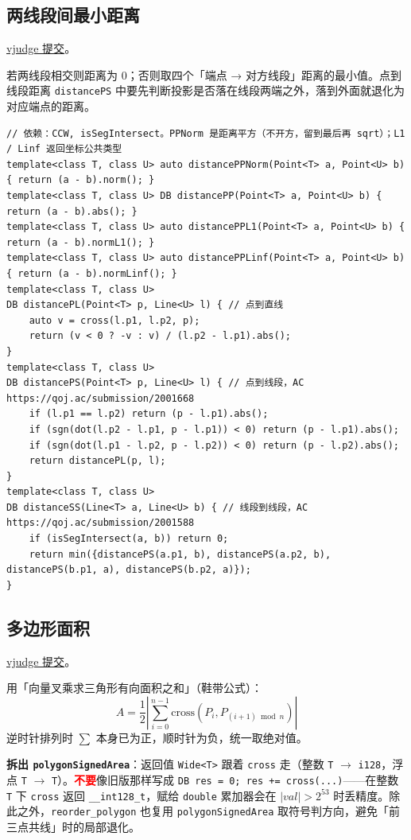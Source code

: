 		\subsection{两线段间最小距离}

		\href{https://vjudge.net/solution/64187931}{vjudge 提交}。

		若两线段相交则距离为 $0$；否则取四个「端点 → 对方线段」距离的最小值。点到线段距离 \texttt{distancePS} 中要先判断投影是否落在线段两端之外，落到外面就退化为对应端点的距离。

\begin{verbatim}
// 依赖：CCW, isSegIntersect。PPNorm 是距离平方（不开方，留到最后再 sqrt）；L1 / Linf 返回坐标公共类型
template<class T, class U> auto distancePPNorm(Point<T> a, Point<U> b) { return (a - b).norm(); }
template<class T, class U> DB distancePP(Point<T> a, Point<U> b) { return (a - b).abs(); }
template<class T, class U> auto distancePPL1(Point<T> a, Point<U> b) { return (a - b).normL1(); }
template<class T, class U> auto distancePPLinf(Point<T> a, Point<U> b) { return (a - b).normLinf(); }
template<class T, class U>
DB distancePL(Point<T> p, Line<U> l) { // 点到直线
	auto v = cross(l.p1, l.p2, p);
	return (v < 0 ? -v : v) / (l.p2 - l.p1).abs();
}
template<class T, class U>
DB distancePS(Point<T> p, Line<U> l) { // 点到线段，AC https://qoj.ac/submission/2001668
	if (l.p1 == l.p2) return (p - l.p1).abs();
	if (sgn(dot(l.p2 - l.p1, p - l.p1)) < 0) return (p - l.p1).abs();
	if (sgn(dot(l.p1 - l.p2, p - l.p2)) < 0) return (p - l.p2).abs();
	return distancePL(p, l);
}
template<class T, class U>
DB distanceSS(Line<T> a, Line<U> b) { // 线段到线段，AC https://qoj.ac/submission/2001588
	if (isSegIntersect(a, b)) return 0;
	return min({distancePS(a.p1, b), distancePS(a.p2, b), distancePS(b.p1, a), distancePS(b.p2, a)});
}
\end{verbatim}

		\subsection{多边形面积}

		\href{https://vjudge.net/solution/64207564}{vjudge 提交}。

		用「向量叉乘求三角形有向面积之和」（鞋带公式）：
		$$
		A = \frac{1}{2} \left| \sum_{i=0}^{n-1} \mathrm{cross}(P_i, P_{(i+1) \bmod n}) \right|
		$$
		逆时针排列时 $\sum$ 本身已为正，顺时针为负，统一取绝对值。

		\textbf{拆出 \texttt{polygonSignedArea}}：返回值 \texttt{Wide<T>} 跟着 \texttt{cross} 走（整数 \texttt{T} $\to$ \texttt{i128}，浮点 \texttt{T} $\to$ \texttt{T}）。\textcolor{red}{\textbf{不要}}像旧版那样写成 \texttt{DB res = 0; res += cross(...)}——在整数 \texttt{T} 下 \texttt{cross} 返回 \texttt{\_\_int128\_t}，赋给 \texttt{double} 累加器会在 $|val| > 2^{53}$ 时丢精度。除此之外，\texttt{reorder\_polygon} 也复用 \texttt{polygonSignedArea} 取符号判方向，避免「前三点共线」时的局部退化。

